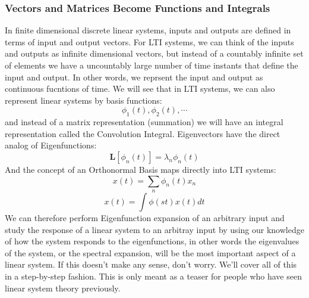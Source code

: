 \subsubsection{Vectors and Matrices Become Functions and Integrals}
 In finite dimensional discrete linear systems, inputs and outputs are defined in terms of input and output vectors.  For LTI systems, we can think of the inputs and outputs as infinite dimensional vectors, but instead of a countably infinite set of elements we have a uncountably large number of time instants that define the input and output.  In other words, we reprsent the input and output as continuous fucntions of time.   We will see that in LTI systems, we can also represent linear systems by basis functions:
    \begin{equation}
        \phi_1(t), \phi_2(t), \cdots
    \end{equation}
and instead of a matrix representation (summation) we will have an integral representation called the Convolution Integral.  Eigenvectors have the direct analog of Eigenfunctions:
    \begin{equation}
        \mathbf{L} [  \phi_n(t)  ] = \lambda_n  \phi_n(t)
    \end{equation}
And the concept of an Orthonormal Basis maps directly into LTI systems:
    \begin{equation}
        x(t) = \sum_n \phi_n(t) x_n
    \end{equation}
    \begin{equation}
        x(t) = \int \phi(s t) x(t) dt
    \end{equation}
We can therefore perform Eigenfunction expansion of an arbitrary input and study the response of a linear system to an arbitray input by using our knowledge of how the system responds to the eigenfunctions, in other words the eigenvalues of the system, or the spectral expansion, will be the most important aspect of a linear system.
If this doesn't make any sense, don't worry.  We'll cover all of this in a step-by-step fashion. This is only meant as a teaser for people who have seen linear system theory previously. 
